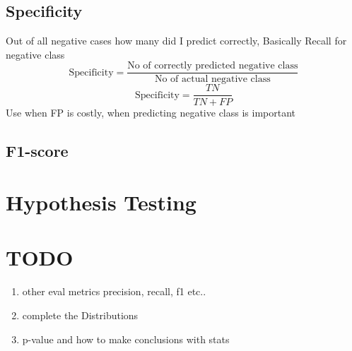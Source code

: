 \documentclass[12pt]{extarticle}
\begin{document}
\subsection{Specificity}
Out of all negative cases how many did I predict correctly, Basically Recall for negative class
$$ \text{Specificity} = \frac{\text{No of correctly predicted negative class}}{\text{No of actual negative class}}  $$
$$ \text{Specificity} = \frac{TN}{TN+FP}$$
Use when FP is costly, when predicting negative class is important

\subsection{F1-score}

\section{Hypothesis Testing}







\section{TODO}
\begin{enumerate}
    \item other eval metrics precision, recall, f1 etc..
    \item complete the Distributions
    \item p-value and how to make conclusions with stats

\end{enumerate}
\end{document}
